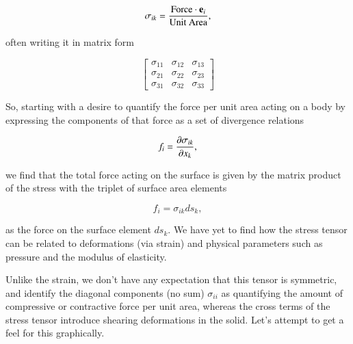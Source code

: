 \begin{equation}\label{eqn:continuumL3:310}
\sigma_{ik} = \frac{\text{Force} \cdot \Be_i}{\text{Unit Area}},
\end{equation}

often writing it in matrix form

\begin{equation}\label{eqn:continuumL3:350}
\begin{bmatrix}
\sigma_{11} & \sigma_{12} & \sigma_{13} \\
\sigma_{21} & \sigma_{22} & \sigma_{23} \\
\sigma_{31} & \sigma_{32} & \sigma_{33}
\end{bmatrix}
\end{equation}

So, starting with a desire to quantify the force per unit area acting on a body by expressing the components of that force as a set of divergence relations

\begin{equation}\label{eqn:revTextContinuumL3:250}
f_i = \PD{x_k}{\sigma_{i k}},
\end{equation}

we find that the total force acting on the surface is given by the matrix product of the stress with the triplet of surface area elements

\begin{equation}\label{eqn:continuumL3:330}
f_i = \sigma_{ik} ds_k,
\end{equation}

as the force on the surface element $ds_k$.   We have yet to find how the stress tensor can be related to deformations (via strain) and physical parameters such as pressure and the modulus of elasticity.  

Unlike the strain, we don't have any expectation that this tensor is symmetric, and identify the diagonal components (no sum) $\sigma_{i i}$ as quantifying the amount of compressive or contractive force per unit area, whereas the cross terms of the stress tensor introduce shearing deformations in the solid.  Let's attempt to get a feel for this graphically.

%

